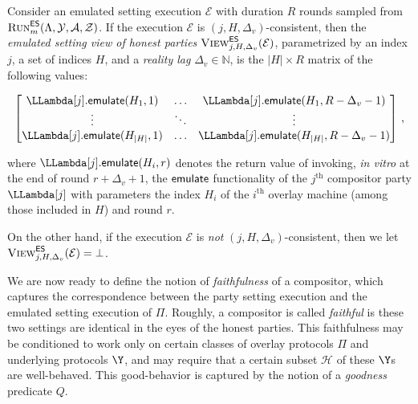 \begin{definition}
  Consider an emulated setting execution $\mathcal{E}$ with duration $R$ rounds
  sampled from $\textsc{Run}^{\textsf{ES}}_m(\Lambda, \mathcal{Y}, \mathcal{A}, \mathcal{Z})$.
  If the execution $\mathcal{E}$ is $(j,H,\Delta_v)$-consistent, then
  the \emph{emulated setting view of honest parties} $\textsc{View}^{\textsf{ES}}_{j,H,\Delta_v}(\mathcal{E})$,
  parametrized by an index $j$, a set of indices $H$, and a \emph{reality lag} $\Delta_v \in \mathbb{N}$,
  is the $|H| \times R$ matrix of the following values:

  \[
  \begin{bmatrix}
    \LLambda[j].\emulateMachine(H_1, 1) & \ldots & \LLambda[j].\emulateMachine(H_1, R - \Delta_v - 1)\\
                                 \vdots & \ddots & \vdots \\
    \LLambda[j].\emulateMachine(H_{|H|}, 1) & \ldots & \LLambda[j].\emulateMachine(H_{|H|}, R - \Delta_v - 1)
  \end{bmatrix}\,,
  \]

  where $\LLambda[j].\emulateMachine(H_i, r)$ denotes the return value of invoking,
  \emph{in vitro} at the end of round $r + \Delta_v + 1$,
  the $\textsf{emulate}$ functionality of the $j^\text{th}$ compositor party $\LLambda[j]$
  with parameters the index $H_i$ of the $i^\text{th}$ overlay machine (among those
  included in $H$) and round $r$.

  On the other hand, if the execution $\mathcal{E}$ is \emph{not} $(j,H,\Delta_v)$-consistent, then
  we let $\textsc{View}^{\textsf{ES}}_{j,H,\Delta_v}(\mathcal{E}) = \bot$.
\end{definition}

\begin{definition}[Lateness]
\end{definition}


We are now ready to define the notion of \emph{faithfulness} of a
compositor, which captures the
correspondence between the party setting execution and the emulated setting
execution of $\Pi$. Roughly, a compositor is called \emph{faithful} is these
two settings are identical in the eyes of the honest parties.
This faithfulness may be conditioned to work only on certain classes
of overlay protocols $\Pi$ and underlying protocols $\Y$, and may
require that a certain subset $\mathcal{H}$ of these $\Y$s are well-behaved.
This good-behavior is captured by the notion of a \emph{goodness} predicate $Q$.

